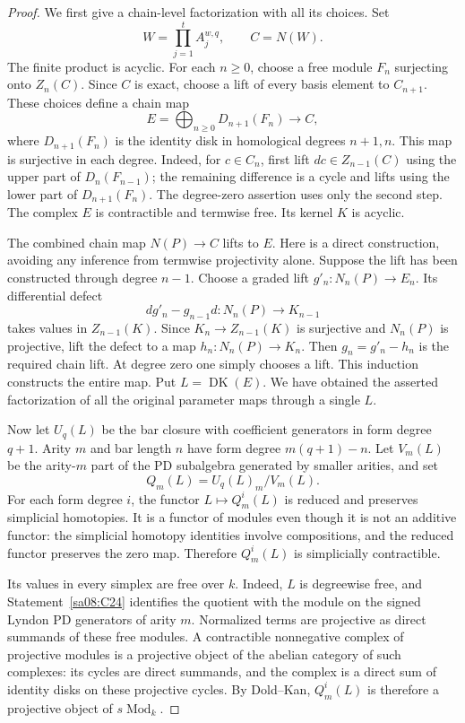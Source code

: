 \begin{proof}
We first give a chain-level factorization with all its choices.
Set
\[
 W=\prod_{j=1}^t A_j^{w,q},\qquad C=N(W).
\]
The finite product is acyclic. For each $n\geq0$, choose a
free module $F_n$ surjecting onto $Z_n(C)$. Since $C$ is exact,
choose a lift of every basis element to $C_{n+1}$. These
choices define a chain map
\[
 E=\bigoplus_{n\geq0}D_{n+1}(F_n)\longrightarrow C,
\]
where $D_{n+1}(F_n)$ is the identity disk in homological
degrees $n+1,n$. This map is surjective in each degree.
Indeed, for $c\in C_n$, first lift $dc\in Z_{n-1}(C)$
using the upper part of $D_n(F_{n-1})$; the remaining
difference is a cycle and lifts using the lower part of
$D_{n+1}(F_n)$. The degree-zero assertion uses only the
second step. The complex $E$ is contractible and termwise
free. Its kernel $K$ is acyclic.

The combined chain map $N(P)\to C$ lifts to $E$.
Here is a direct construction, avoiding any inference from
termwise projectivity alone. Suppose the lift has been
constructed through degree $n-1$. Choose a graded lift
$g'_n\colon N_n(P)\to E_n$. Its differential defect
\[
 dg'_n-g_{n-1}d\colon N_n(P)\longrightarrow K_{n-1}
\]
takes values in $Z_{n-1}(K)$. Since
$K_n\to Z_{n-1}(K)$ is surjective and $N_n(P)$ is projective,
lift the defect to a map $h_n\colon N_n(P)\to K_n$.
Then $g_n=g'_n-h_n$ is the required chain lift.
At degree zero one simply chooses a lift. This induction
constructs the entire map. Put $L=\operatorname{DK}(E)$.
We have obtained the asserted factorization of all the
original parameter maps through a single $L$.

Now let $U_q(L)$ be the bar closure with coefficient
generators in form degree $q+1$. Arity $m$ and bar length
$n$ have form degree $m(q+1)-n$. Let $V_m(L)$ be the
arity-$m$ part of the PD subalgebra generated by smaller
arities, and set
\[
 Q_m(L)=U_q(L)_m/V_m(L).
\]
For each form degree $i$, the functor
$L\mapsto Q_m^i(L)$ is reduced and preserves simplicial
homotopies. It is a functor of modules even though it is
not an additive functor: the simplicial homotopy identities
involve compositions, and the reduced functor preserves
the zero map. Therefore $Q_m^i(L)$ is simplicially
contractible.

Its values in every simplex are free over $k$. Indeed,
$L$ is degreewise free, and Statement~\ref{sa08:C24}
identifies the quotient with the module on the signed
Lyndon PD generators of arity $m$. Normalized terms
are projective as direct summands of these free modules.
A contractible nonnegative complex of projective modules
is a projective object of the abelian category of such
complexes: its cycles are direct summands, and the complex
is a direct sum of identity disks on these projective
cycles. By Dold--Kan, $Q_m^i(L)$ is therefore a projective
object of $s\operatorname{Mod}_k$.


\end{proof}
